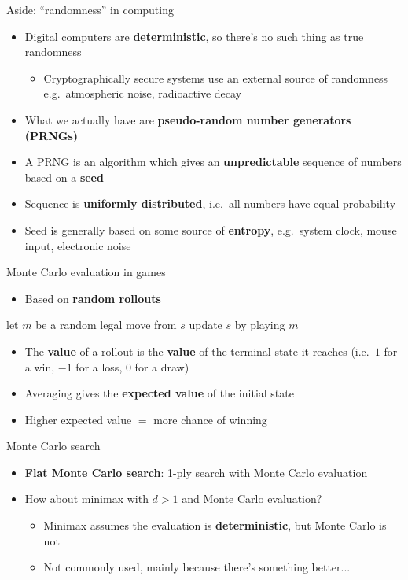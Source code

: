 \begin{frame}{Aside: ``randomness'' in computing}
	\begin{itemize}
		\pause\item Digital computers are \textbf{deterministic}, so there's no such thing as true randomness
			\begin{itemize}
				\pause\item Cryptographically secure systems use an external source of randomness e.g.\ atmospheric noise, radioactive decay
			\end{itemize}
		\pause\item What we actually have are \textbf{pseudo-random number generators (PRNGs)}
		\pause\item A PRNG is an algorithm which gives an \textbf{unpredictable} sequence of numbers based on a \textbf{seed}
		\pause\item Sequence is \textbf{uniformly distributed}, i.e.\ all numbers have equal probability
		\pause\item Seed is generally based on some source of \textbf{entropy}, e.g.\ system clock, mouse input, electronic noise
	\end{itemize}
\end{frame}

\begin{frame}{Monte Carlo evaluation in games}
	\begin{itemize}
		\pause\item Based on \textbf{random rollouts}
	\end{itemize}
	\pause
	\begin{algorithmic}
			\State let $m$ be a random legal move from $s$
			\State update $s$ by playing $m$
		\EndWhile
	\end{algorithmic}
	\begin{itemize}
		\pause\item The \textbf{value} of a rollout is the \textbf{value} of the terminal state it reaches (i.e.\ $1$ for a win, $-1$ for a loss, $0$ for a draw)
		\pause\item Averaging gives the \textbf{expected value} of the initial state
		\pause\item Higher expected value $=$ more chance of winning
	\end{itemize}
\end{frame}

\begin{frame}{Monte Carlo search}
	\begin{itemize}
		\pause\item \textbf{Flat Monte Carlo search}: 1-ply search with Monte Carlo evaluation
		\pause\item How about minimax with $d>1$ and Monte Carlo evaluation?
			\begin{itemize}
				\pause\item Minimax assumes the evaluation is \textbf{deterministic}, but Monte Carlo is not
				\pause\item Not commonly used, mainly because there's something better...
			\end{itemize}
	\end{itemize}
\end{frame}

